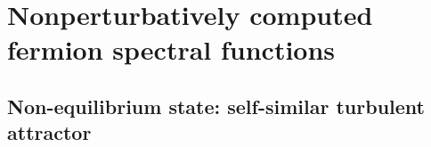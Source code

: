 \documentclass[]{webofc}
\def\be{\begin{equation}}
\def\ee{\end{equation}}
\newcommand{\mbf}{\mathbf}
\newcommand{\fig}{Fig.~}
\newcommand{\se}{Sec.~}
\newcommand{\re}{Ref.~}
\newcommand{\pToFigs}{.}
\begin{document}
\begin{comment}
\begin{figure}[t]
\centering
\texttt{[image: \\pToFigs/Plot\_rhoV\_dt\_free.pdf]}
\caption{Components of the free spectral function at momentum $a_s \mbf p = (0.098, 0.195, 0.29)$ computed using the algorithm described in \se\ref{sec:simul_alg_fermions}. Continuous lines correspond to analytical expectations. Figure taken from \re\cite{Boguslavski:2021kdd}.}
\label{fig:free_rho}       %
\end{figure}

\subsection{Benchmark for free fermions}

We first apply the method to a free theory with gluonic fields set to $U^{i}(t',\mbf x)=1$, $E^{i}(t',\mbf x)=0$ and run the algorithm on a $64^3$ lattice for momentum $a_s \mbf p = (0.098, 0.195, 0.29)$ and small mass $m\,a_s = 0.003125$. Analytically, the free spectral function reads $\rho^{\text{free}}(\Delta t,\mbf p) = \gamma^0 \cos(E_{\mbf p} \Delta t) + i \left( \gamma^j \frac{\hat{p}^j}{E_{\mbf p}} - \frac{m_{\mbf p}}{E_{\mbf p}} \right)\,\sin(E_{\mbf p} \Delta t)$. The non-vanishing components are
\be
 \label{eq:rho_compon}
 \rho^{0}_{V}=\frac{1}{4} \text{Tr} (\rho \gamma^{0})\,, \quad
 \rho_{V}=- \frac{E_{\mbf p}\,p^{j}}{4\,p^2}\, \text{Tr} (\rho \gamma^{j})\,, \quad
 \rho_{S}=\frac{1}{4} \text{Tr} (\rho).
\ee
They are shown in \fig\ref{fig:free_rho} and nicely agree with the analytical results. All other components of $\rho$ vanish up to machine precision $\sim 10^{-16}$. 
\end{comment}



\section{Nonperturbatively computed fermion spectral functions}
\label{sec:fermion_rho}


\subsection{Non-equilibrium state: self-similar turbulent attractor}
\end{document}
